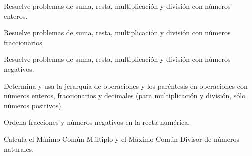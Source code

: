 \item Resuelve problemas de suma, resta, multiplicación y división con números enteros.
\item Resuelve problemas de suma, resta, multiplicación y división con números fraccionarios.
\item Resuelve problemas de suma, resta, multiplicación y división con números negativos.
\item Determina y usa la jerarquía de operaciones y los paréntesis en operaciones con números enteros, fraccionarios y decimales (para multiplicación y división, sólo números positivos).
\item Ordena fracciones y números negativos en la recta numérica.
\item Calcula el Mínimo Común Múltiplo y el Máximo Común Divisor de números naturales.